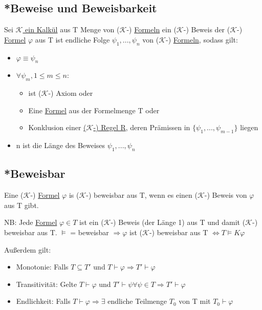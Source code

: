 \documentclass[12pt,a4paper]{article} %
\begin{document}
	\subsection{*Beweise und Beweisbarkeit}
	Sei \hyperref[Kalkul]{$\mathcal{K}$ ein Kalkül} aus T Menge von ($\mathcal{K}$-) \hyperref[Formel]{Formeln} ein ($\mathcal{K}$-) Beweis der ($\mathcal{K}$-) \hyperref[Formel]{Formel} $\varphi$ aus T ist endliche Folge $\psi_1, ..., \psi_n$ von ($\mathcal{K}$-) \hyperref[Formel]{Formeln}, sodass gilt:
	\begin{itemize}
		\item $\varphi \equiv \psi_n$
		\item $\forall \psi_m, 1 \le m \le n:$ \begin{itemize}
		\item ist ($\mathcal{K}$-) Axiom oder
		\item Eine \hyperref[Formel]{Formel} aus der Formelmenge T oder
		\item Konklusion einer \hyperref[Kalkul]{($\mathcal{K}$-) Regel R}, deren Prämissen in $\{\psi_1, ..., \psi_{m - 1}\}$ liegen
		\end{itemize}
		\item n ist die Länge des Beweises $\psi_1, ..., \psi_n$
	\end{itemize}

	\subsection{*Beweisbar}
	\label{Beweisbar}
	Eine ($\mathcal{K}$-) \hyperref[Formel]{Formel} $\varphi$ is ($\mathcal{K}$-) beweisbar aus T, wenn es einen ($\mathcal{K}$-) Beweis von $\varphi$ aus T gibt.
	
	NB: Jede \hyperref[Formel]{Formel} $\varphi \in T$ ist ein ($\mathcal{K}$-) Beweis (der Länge 1) aus T und damit
	($\mathcal{K}$-) beweisbar aus T.
	$\hyperref[Erfullbar]{\vDash}$ = beweisbar $\Rightarrow \varphi$ ist ($\mathcal{K}$-) beweisbar aus T $\Leftrightarrow T \hyperref[Erfullbar]{\vDash} K \varphi$
	
	Außerdem gilt:
	
	\begin{itemize}
		\item Monotonie: Falls $T \subseteq T'$ und $T \hyperref[Beweisbar]{\vdash} \varphi \Rightarrow T' \hyperref[Beweisbar]{\vdash} \varphi$
		\item Transitivität: Gelte $T \hyperref[Beweisbar]{\vdash} \varphi$ und $T' \hyperref[Beweisbar]{\vdash} \psi \forall \psi \in T \Rightarrow T' \hyperref[Beweisbar]{\vdash} \varphi$ 
		\item Endlichkeit: Falls $T \hyperref[Beweisbar]{\vdash} \varphi \Rightarrow \exists$ endliche Teilmenge $T_0$ von T mit $T_0 \hyperref[Beweisbar]{\vdash} \varphi$
	\end{itemize}
\end{document}
